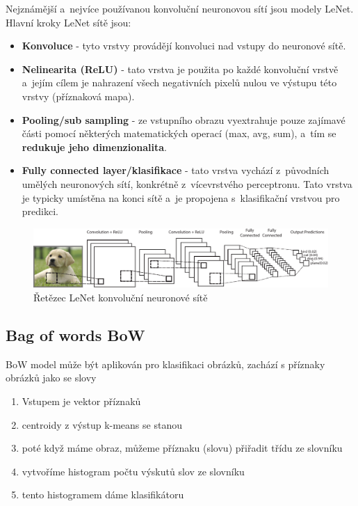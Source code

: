 Nejznámější a~nejvíce používanou konvoluční neuronovou sítí jsou modely LeNet.
Hlavní kroky LeNet sítě jsou:
\begin{itemize}
  \item{\textbf{Konvoluce} - tyto vrstvy provádějí konvoluci nad vstupy do neuronové sítě.}
  \item{\textbf{Nelinearita (ReLU)} - tato vrstva je použita po každé konvoluční vrstvě a~jejím cílem je nahrazení všech negativních pixelů nulou ve výstupu této vrstvy (příznaková mapa).}
  \item{\textbf{Pooling/sub sampling} - ze vstupního obrazu vyextrahuje pouze zajímavé části pomocí některých matematických operací (max, avg, sum), a~tím se \textbf{redukuje jeho dimenzionalita}.}
  \item{\textbf{Fully connected layer/klasifikace} - tato vrstva vychází z~původních umělých neuronových sítí, konkrétně z~vícevrstvého perceptronu. Tato vrstva je typicky umístěna na konci sítě a~je propojena s~klasifikační vrstvou pro predikci.}
\end{itemize}
\begin{figure}[H]
\centering
\includegraphics[width=1.1\linewidth]{assets/9_cnn.pdf}
\caption{Řetězec LeNet konvoluční neuronové sítě}
\label{fig:cnn}
\end{figure}

\subsection{Bag of words BoW}
BoW model může být aplikován pro klasifikaci obrázků, zachází s příznaky obrázků jako se slovy
\begin{enumerate}
\item Vstupem je vektor příznaků
\item centroidy z výstup k-means se stanou 
\item poté když máme obraz, můžeme příznaku (slovu) přiřadit třídu ze slovníku
\item vytvoříme histogram počtu výskutů slov ze slovníku
\item tento histogramem dáme klasifikátoru
\end{enumerate}

